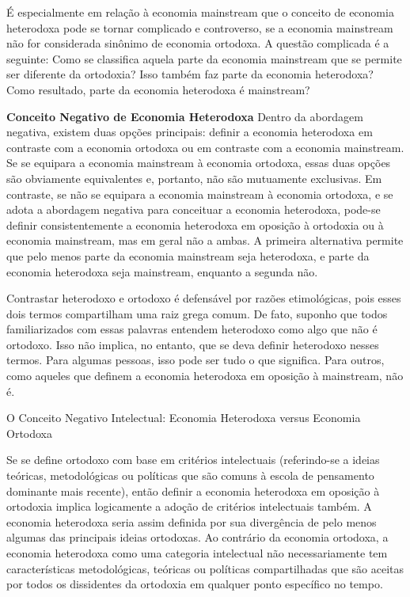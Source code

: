 \documentclass[a4paper,12pt]{article}[abntex2]
\begin{document}
É especialmente em relação à economia mainstream que o conceito de economia heterodoxa pode se tornar complicado e controverso, se a economia mainstream não for considerada sinônimo de economia ortodoxa. A questão complicada é a seguinte: Como se classifica aquela parte da economia mainstream que se permite ser diferente da ortodoxia? Isso também faz parte da economia heterodoxa? Como resultado, parte da economia heterodoxa é mainstream?

\textbf{Conceito Negativo de Economia Heterodoxa
}
Dentro da abordagem negativa, existem duas opções principais: definir a economia heterodoxa em contraste com a economia ortodoxa ou em contraste com a economia mainstream. Se se equipara a economia mainstream à economia ortodoxa, essas duas opções são obviamente equivalentes e, portanto, não são mutuamente exclusivas. Em contraste, se não se equipara a economia mainstream à economia ortodoxa, e se adota a abordagem negativa para conceituar a economia heterodoxa, pode-se definir consistentemente a economia heterodoxa em oposição à ortodoxia ou à economia mainstream, mas em geral não a ambas. A primeira alternativa permite que pelo menos parte da economia mainstream seja heterodoxa, e parte da economia heterodoxa seja mainstream, enquanto a segunda não.

Contrastar heterodoxo e ortodoxo é defensável por razões etimológicas, pois esses dois termos compartilham uma raiz grega comum. De fato, suponho que todos familiarizados com essas palavras entendem heterodoxo como algo que não é ortodoxo. Isso não implica, no entanto, que se deva definir heterodoxo nesses termos. Para algumas pessoas, isso pode ser tudo o que significa. Para outros, como aqueles que definem a economia heterodoxa em oposição à mainstream, não é.

O Conceito Negativo Intelectual: Economia Heterodoxa versus Economia Ortodoxa

Se se define ortodoxo com base em critérios intelectuais (referindo-se a ideias teóricas, metodológicas ou políticas que são comuns à escola de pensamento dominante mais recente), então definir a economia heterodoxa em oposição à ortodoxia implica logicamente a adoção de critérios intelectuais também. A economia heterodoxa seria assim definida por sua divergência de pelo menos algumas das principais ideias ortodoxas. Ao contrário da economia ortodoxa, a economia heterodoxa como uma categoria intelectual não necessariamente tem características metodológicas, teóricas ou políticas compartilhadas que são aceitas por todos os dissidentes da ortodoxia em qualquer ponto específico no tempo.
\end{document}
